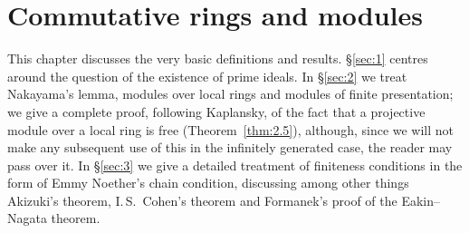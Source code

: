 \chapter{Commutative rings and modules}\label{ch:1}

This chapter discusses the very basic definitions and results.
\S\ref{sec:1} centres around the question of the existence of prime ideals. In \S\ref{sec:2}
we treat Nakayama's lemma, modules over local rings and modules of
finite presentation; we give a complete proof, following Kaplansky, of the
fact that a projective module over a local ring is free (Theorem~\ref{thm:2.5}),
although, since we will not make any subsequent use of this in the infinitely
generated case, the reader may pass over it. In \S\ref{sec:3} we give a detailed
treatment of finiteness conditions in the form of Emmy Noether's chain
condition, discussing among other things Akizuki's theorem, I.\,S.\ Cohen's
theorem and Formanek's proof of the Eakin--Nagata theorem.




